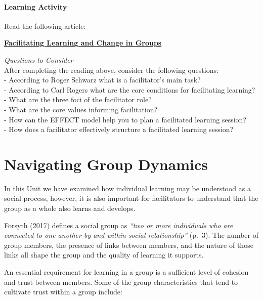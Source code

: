 \documentclass[
]{book}
\begin{document}
\begin{reflect}
\hypertarget{learning-activity}{%
\paragraph*{Learning Activity}\label{learning-activity}}

Read the following article:

\href{https://infed.org/mobi/facilitating-learning-and-change-in-groups-and-group-sessions/}{\textbf{Facilitating
Learning and Change in Groups}}

\emph{Questions to Consider}\\
After completing the reading above, consider the following questions:\\
- According to Roger Schwarz what is a facilitator's main task?\\
- According to Carl Rogers what are the core conditions for facilitating
learning?\\
- What are the three foci of the facilitator role?\\
- What are the core values informing facilitation?\\
- How can the EFFECT model help you to plan a facilitated learning
session?\\
- How does a facilitator effectively structure a facilitated learning
session?
\end{reflect}

\hypertarget{navigating-group-dynamics}{%
\section{Navigating Group Dynamics}\label{navigating-group-dynamics}}

In this Unit we have examined how individual learning may be understood as a social process, however, it is also important for facilitators to understand that the group as a whole also learns and develops.

Forsyth (2017) defines a social group as \emph{``two or more individuals who are connected to one another by and within social relationship''} (p.~3). The number of group members, the presence of links between members, and the nature of those links all shape the group and the quality of learning it supports.

An essential requirement for learning in a group is a sufficient level of cohesion and trust between members. Some of the group characteristics that tend to cultivate trust within a group include:
\end{document}
